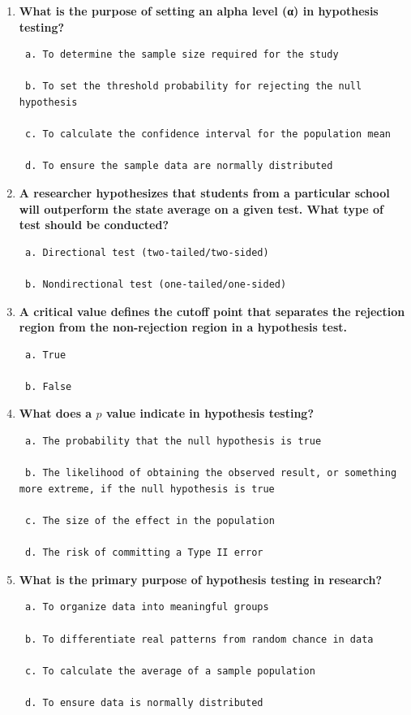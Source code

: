 \documentclass[
  letterpaper,
  DIV=11,
  numbers=noendperiod]{scrreprt}
\begin{document}
\begin{enumerate}
\def\labelenumi{\arabic{enumi}.}
\item
  \textbf{What is the purpose of setting an alpha level (α) in
  hypothesis testing?}

\begin{verbatim}
 a. To determine the sample size required for the study 

 b. To set the threshold probability for rejecting the null hypothesis 

 c. To calculate the confidence interval for the population mean 

 d. To ensure the sample data are normally distributed 
\end{verbatim}
\item
  \textbf{A researcher hypothesizes that students from a particular
  school will outperform the state average on a given test. What type of
  test should be conducted?}

\begin{verbatim}
 a. Directional test (two-tailed/two-sided) 

 b. Nondirectional test (one-tailed/one-sided)  
\end{verbatim}
\item
  \textbf{A critical value defines the cutoff point that separates the
  rejection region from the non-rejection region in a hypothesis test.}

\begin{verbatim}
 a. True 

 b. False 
\end{verbatim}
\item
  \textbf{What does a \(p\) value indicate in hypothesis testing?}

\begin{verbatim}
 a. The probability that the null hypothesis is true 

 b. The likelihood of obtaining the observed result, or something more extreme, if the null hypothesis is true 

 c. The size of the effect in the population 

 d. The risk of committing a Type II error 
\end{verbatim}
\item
  \textbf{What is the primary purpose of hypothesis testing in
  research?}

\begin{verbatim}
 a. To organize data into meaningful groups 

 b. To differentiate real patterns from random chance in data 

 c. To calculate the average of a sample population 

 d. To ensure data is normally distributed 
\end{verbatim}
\end{enumerate}
\end{document}
